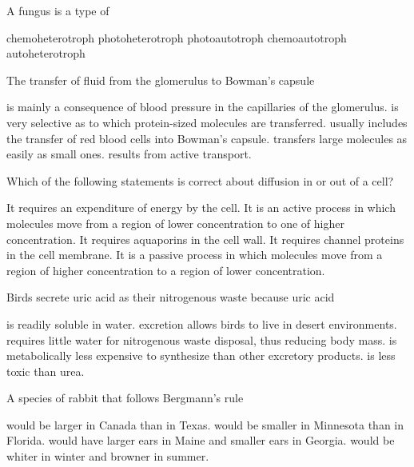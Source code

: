 
\question
A fungus is a type of 
\begin{choices}
\correctchoice chemoheterotroph 
\choice  photoheterotroph 
\choice  photoautotroph 
\choice chemoautotroph 
\choice  autoheterotroph 
\end{choices}

\question
The transfer of fluid from the glomerulus to Bowman's capsule

\begin{choices}
\correctchoice  is mainly a consequence of blood pressure in the capillaries of the glomerulus. 
\choice is very selective as to which protein-sized molecules are transferred. 
\choice usually includes the transfer of red blood cells into Bowman's capsule. 
\choice transfers large molecules  as easily as small ones. 
\choice results from active transport. 
\end{choices}

\question
Which of the following statements is correct about diffusion in or out of a cell?

\begin{choices}
\choice It requires an expenditure of energy by the cell. 
\choice It is an active process in which molecules move from a region of lower concentration to one of higher concentration. 
\choice It requires aquaporins in the cell wall. 
\choice It requires channel proteins in the cell membrane. 
\correctchoice It is a passive process in which molecules move from a region of higher concentration to a region of lower concentration. 
\end{choices}

\question
Birds secrete uric acid as their nitrogenous waste because uric acid

\begin{choices}
\choice is readily soluble in water. 
\choice excretion allows birds to live in desert environments. 
\correctchoice requires little water for nitrogenous waste disposal, thus reducing body mass. 
\choice is metabolically less expensive to synthesize than other excretory products. 
\correctchoice is less toxic than urea. 
\end{choices}

\question
A species of rabbit that follows Bergmann's rule 

\begin{choices}
\correctchoice  would be larger in Canada than in Texas. 
\choice would be smaller in Minnesota than in Florida. 
\choice would have larger ears in Maine and smaller ears in Georgia. 
\choice would be whiter in winter and browner in summer. 
\end{choices}


